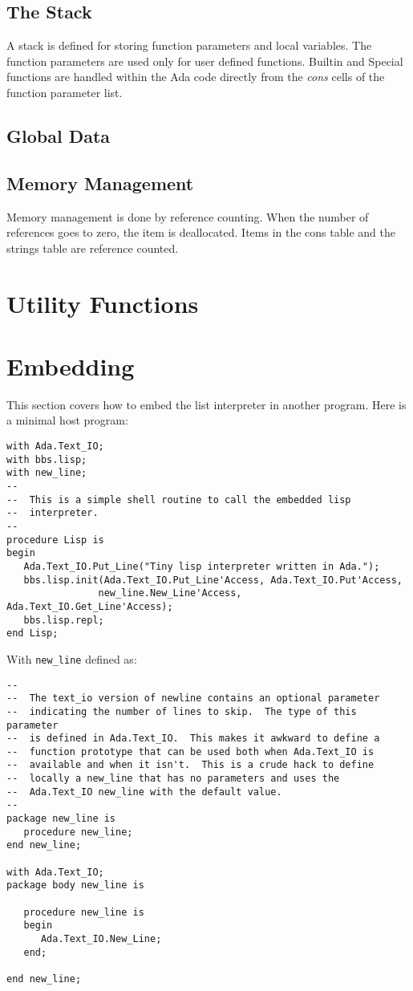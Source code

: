 \documentclass[10pt, openany]{book}
\newcommand{\function}[1]{\texttt{#1}}
\begin{document}
\subsection{The Stack}
\label{sec:Stack}
A stack is defined for storing function parameters and local variables.  The function parameters are used only for user defined functions.  Builtin and Special functions are handled within the Ada code directly from the \emph{cons} cells of the function parameter list.

\subsection{Global Data}

\subsection{Memory Management}
Memory management is done by reference counting.  When the number of references goes to zero, the item is deallocated.  Items in the cons table and the strings table are reference counted.

\section{Utility Functions}

\section{Embedding}
This section covers how to embed the list interpreter in another program.  Here is a minimal host program:
\begin{lstlisting}
with Ada.Text_IO;
with bbs.lisp;
with new_line;
--
--  This is a simple shell routine to call the embedded lisp
--  interpreter.
--
procedure Lisp is
begin
   Ada.Text_IO.Put_Line("Tiny lisp interpreter written in Ada.");
   bbs.lisp.init(Ada.Text_IO.Put_Line'Access, Ada.Text_IO.Put'Access,
                new_line.New_Line'Access, Ada.Text_IO.Get_Line'Access);
   bbs.lisp.repl;
end Lisp;
\end{lstlisting}

With \function{new\_line} defined as:
\begin{lstlisting}
--
--  The text_io version of newline contains an optional parameter
--  indicating the number of lines to skip.  The type of this parameter
--  is defined in Ada.Text_IO.  This makes it awkward to define a
--  function prototype that can be used both when Ada.Text_IO is
--  available and when it isn't.  This is a crude hack to define
--  locally a new_line that has no parameters and uses the
--  Ada.Text_IO new_line with the default value.
--
package new_line is
   procedure new_line;
end new_line;

with Ada.Text_IO;
package body new_line is

   procedure new_line is
   begin
      Ada.Text_IO.New_Line;
   end;

end new_line;
\end{lstlisting}
\end{document}

